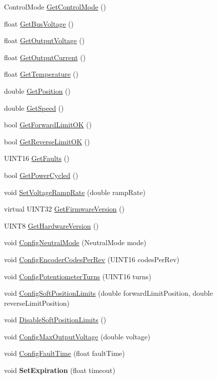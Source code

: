 \begin{DoxyCompactItemize}
\item 
ControlMode \hyperlink{classCANJaguar_a0182b7175a6ea7e2d28dc6b331f7dbff}{GetControlMode} ()
\item 
float \hyperlink{classCANJaguar_a9ab46336737e40a6d765f839cd43db61}{GetBusVoltage} ()
\item 
float \hyperlink{classCANJaguar_a9c8ff9ed5747ce175a5215d2b18e973d}{GetOutputVoltage} ()
\item 
float \hyperlink{classCANJaguar_a1845e946d4be9219d7b3ac3c6152f5b8}{GetOutputCurrent} ()
\item 
float \hyperlink{classCANJaguar_aa58c2cc33eeebbb6684227c5500d7cbc}{GetTemperature} ()
\item 
double \hyperlink{classCANJaguar_a87df60fbda9e2cb8f6f8072f68476444}{GetPosition} ()
\item 
double \hyperlink{classCANJaguar_afafb32f44cd1525e351615d6999f59f1}{GetSpeed} ()
\item 
bool \hyperlink{classCANJaguar_a0f11a7f13319f448e493fad2dc47e71b}{GetForwardLimitOK} ()
\item 
bool \hyperlink{classCANJaguar_a0efb888bb3239cad4ea0f27890998dff}{GetReverseLimitOK} ()
\item 
UINT16 \hyperlink{classCANJaguar_a85127197e529c31e21c7f7dd601d1b29}{GetFaults} ()
\item 
bool \hyperlink{classCANJaguar_a37066e9210891a674ce80bee695c5ba5}{GetPowerCycled} ()
\item 
void \hyperlink{classCANJaguar_a73540797125ae698a72806f9cf10330d}{SetVoltageRampRate} (double rampRate)
\item 
virtual UINT32 \hyperlink{classCANJaguar_af0de370823437c4f9db998fcb009431e}{GetFirmwareVersion} ()
\item 
UINT8 \hyperlink{classCANJaguar_a872d409492668ef44438dfe73bdb5efd}{GetHardwareVersion} ()
\item 
void \hyperlink{classCANJaguar_a1f0512aa6c0b6eb60d37c3d8a3fd0f57}{ConfigNeutralMode} (NeutralMode mode)
\item 
void \hyperlink{classCANJaguar_a1b3155962cb795c6c5ee31e593ad97ec}{ConfigEncoderCodesPerRev} (UINT16 codesPerRev)
\item 
void \hyperlink{classCANJaguar_a4c7f1f58c5dd5f3af20ed6867573df19}{ConfigPotentiometerTurns} (UINT16 turns)
\item 
void \hyperlink{classCANJaguar_a388b3188432b3e7d7d73b29ba7e61b8f}{ConfigSoftPositionLimits} (double forwardLimitPosition, double reverseLimitPosition)
\item 
void \hyperlink{classCANJaguar_ae291e933f69ddd35a7b0da83520596d9}{DisableSoftPositionLimits} ()
\item 
void \hyperlink{classCANJaguar_a82e172281e9c452d31b881693288a6ae}{ConfigMaxOutputVoltage} (double voltage)
\item 
void \hyperlink{classCANJaguar_a25d6360eb331a6e24b36cfbf8911e914}{ConfigFaultTime} (float faultTime)
\item 
\hypertarget{classCANJaguar_aa7de5a947804cc2233a8246b9801e025}{
void {\bfseries SetExpiration} (float timeout)}
\label{classCANJaguar_aa7de5a947804cc2233a8246b9801e025}


\end{DoxyCompactItemize}
